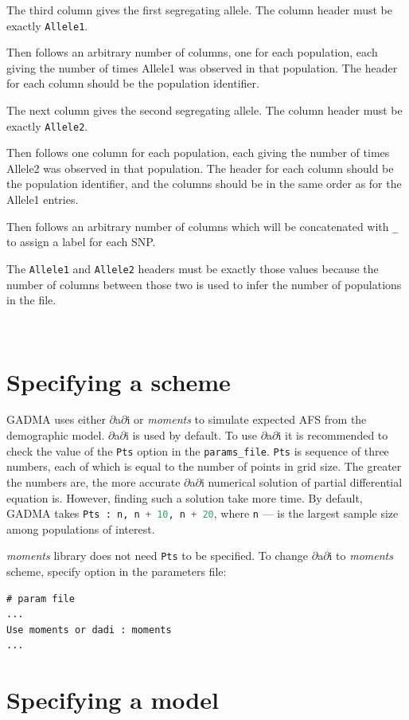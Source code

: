 \documentclass[12pt]{article}
\makeatletter
\newcommand{\dadi}{$\partial$a$\partial$i\xspace}
\newcommand{\moments}{\textit{moments}\xspace}
\newcommand{\py}[1]{\lstinline[language=Python, showstringspaces=False]@#1@}
\makeatother
\begin{document}
The third column gives the first segregating allele.
The column header must be exactly \py{Allele1}.

Then follows an arbitrary number of columns, one for each population, each giving the number of times Allele1 was observed in that population.
The header for each column should be the population identifier.

The next column gives the second segregating allele.
The column header must be exactly \py{Allele2}.

Then follows one column for each population, each giving the number of times Allele2 was observed in that population.
The header for each column should be the population identifier, and the columns should be in the same order as for the Allele1 entries.

Then follows an arbitrary number of columns which will be concatenated with \py{_} to assign a label for each SNP.

The \py{Allele1} and \py{Allele2} headers must be exactly those values because the number of columns between those two is used to infer the number of populations in the file.

~\
\section{Specifying a scheme}

GADMA uses either \dadi or \moments to simulate expected AFS from the demographic model. \dadi is used by default. To use \dadi it is recommended to check the value of the \py{Pts} option in the \py{params_file}. \py{Pts} is sequence of three numbers, each of which is equal to the number of points in grid size. The greater the numbers are, the more accurate \dadi numerical solution of partial differential equation is. However, finding such a solution take more time. By default, GADMA takes \py{Pts : n, n + 10, n + 20}, where \py{n} — is the largest sample size among populations of interest. 

\moments library does not need \py{Pts} to be specified. To change \dadi to \moments scheme, specify option in the parameters file:

\begin{lstlisting}
# param file
...
Use moments or dadi : moments
...
\end{lstlisting}

\section{Specifying a model}
\end{document}
